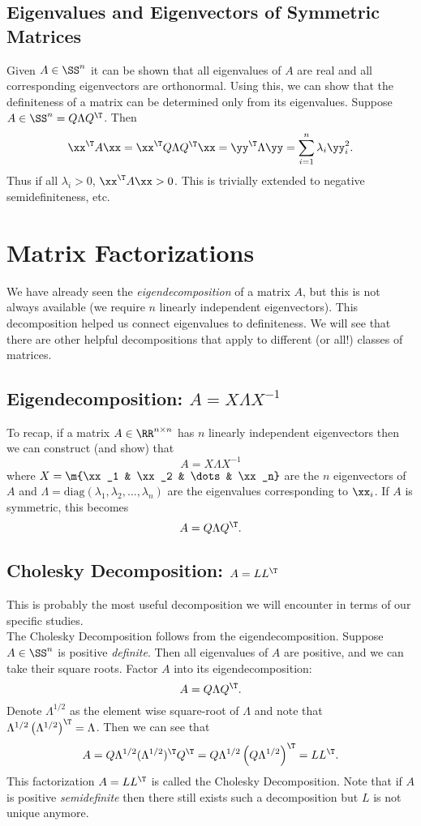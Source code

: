 \documentclass{article}
\begin{document}
\subsection{Eigenvalues and Eigenvectors of Symmetric Matrices}

Given $A\in\SS^n$ it can be shown that all eigenvalues of $A$ are
real and all corresponding eigenvectors are orthonormal. Using this,
we can show that the definiteness of a matrix can be determined only
from its eigenvalues. Suppose $A\in\SS^n = Q\Lambda Q^\T$. Then
\[
    \xx^\T A\xx = \xx^\T Q\Lambda Q^\T\xx = \yy^\T\Lambda\yy = \sum_{i=1}^n \lambda_i\yy_i^2.
\]
Thus if all $\lambda_i > 0$, $\xx^\T A\xx > 0$. This is trivially extended
to negative semidefiniteness, etc.

\section{Matrix Factorizations}

We have already seen the \textit{eigendecomposition} of a matrix $A$,
but this is not always available (we require $n$ linearly independent
eigenvectors). This decomposition helped us connect eigenvalues to
definiteness. We will see that there are other helpful decompositions
that apply to different (or all!) classes of matrices.

\subsection{Eigendecomposition: $A = X\Lambda X^{-1}$}

To recap, if a matrix $A\in\RR^{n\times n}$ has $n$ linearly independent
eigenvectors then we can construct (and show) that
\[
    A = X \Lambda X^{-1}
\]
where $X = \m{\xx_1 & \xx_2 & \dots & \xx_n}$ are the $n$ eigenvectors of
$A$ and $\Lambda = \mathrm{diag}(\lambda_1, \lambda_2,\dots, \lambda_n)$
are the eigenvalues corresponding to $\xx_i$. If $A$ is symmetric, this becomes
\[
    A = Q\Lambda Q^\T.
\]

\subsection{Cholesky Decomposition: $A = LL^\T$}

This is probably the most useful decomposition we will encounter
in terms of our specific studies.\\

The Cholesky Decomposition follows from the eigendecomposition.
Suppose $A\in\SS^n$ is positive \textit{definite}. Then all eigenvalues
of $A$ are positive, and we can take their square roots. Factor
$A$ into its eigendecomposition:
\[
    A = Q\Lambda Q^\T.
\]
Denote $\Lambda^{1/2}$ as the element wise square-root of $\Lambda$
and note that $\Lambda^{1/2}\left(\Lambda^{1/2}\right)^\T = \Lambda$.
Then we can see that
\[
    A = Q\Lambda^{1/2} (\Lambda^{1/2})^\T Q^\T = Q\Lambda^{1/2}\left(Q\Lambda^{1/2}\right)^\T = LL^\T.
\]
This factorization $A=LL^\T$ is called the Cholesky Decomposition. Note
that if $A$ is positive \textit{semidefinite} then there still exists such
a decomposition but $L$ is not unique anymore.\\
\end{document}
